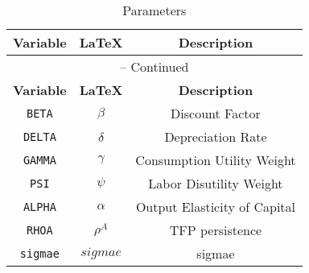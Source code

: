 \begin{center}
\begin{longtable}{ccc}
\caption{Parameters}\\%
\hline%
\multicolumn{1}{c}{\textbf{Variable}} &
\multicolumn{1}{c}{\textbf{\LaTeX}} &
\multicolumn{1}{c}{\textbf{Description}}\\%
\hline\hline%
\endfirsthead
\multicolumn{3}{c}{{\tablename} \thetable{} -- Continued}\\%
\hline%
\multicolumn{1}{c}{\textbf{Variable}} &
\multicolumn{1}{c}{\textbf{\LaTeX}} &
\multicolumn{1}{c}{\textbf{Description}}\\%
\hline\hline%
\endhead
\texttt{BETA} & ${\beta}$ & Discount Factor\\
\texttt{DELTA} & ${\delta}$ & Depreciation Rate\\
\texttt{GAMMA} & ${\gamma}$ & Consumption Utility Weight\\
\texttt{PSI} & ${\psi}$ & Labor Disutility Weight\\
\texttt{ALPHA} & ${\alpha}$ & Output Elasticity of Capital\\
\texttt{RHOA} & ${\rho^A}$ & TFP persistence\\
\texttt{sigmae} & $sigmae$ & sigmae\\
\hline%
\end{longtable}
\end{center}
